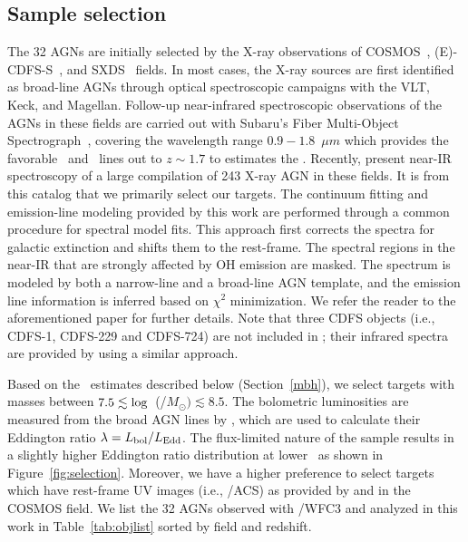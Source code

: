 \documentclass[apj]{emulateapj}
\begin{document}
\subsection{Sample selection}\label{sec:target_selection}

The 32 AGNs are initially selected by the X-ray observations of COSMOS~\citep{Civano2016}, (E)-CDFS-S~\citep{Lehmer2005, Xue2011}, and SXDS~\citep{Ueda2008} fields. In most cases, the X-ray sources are first identified as broad-line AGNs through optical spectroscopic campaigns with the VLT, Keck, and Magellan. Follow-up near-infrared spectroscopic observations of the AGNs in these fields are carried out with Subaru's Fiber Multi-Object Spectrograph~\citep[FMOS, ][]{Kimura2010, Nobuta2012,Matsuoka2013}, covering the wavelength range $0.9-1.8$~$\mu m$ which provides the favorable \halpha\ and \hbeta\ lines out to $z\sim1.7$ to estimates the \mbh. Recently, \citet{Schulze2018} present near-IR spectroscopy of a large compilation of 243 X-ray AGN in these fields. It is from this catalog that we primarily select our targets. 
The continuum fitting and emission-line modeling provided by this work are performed through a common procedure for spectral model fits. This approach first corrects the spectra for galactic extinction and shifts them to the rest-frame. The spectral regions in the near-IR that are strongly affected by OH emission are masked. The spectrum is modeled by both a narrow-line and a broad-line AGN template, and the emission line information is inferred based on $\chi^2$ minimization. We refer the reader to the aforementioned paper for further details.
Note that three CDFS objects (i.e., CDFS-1, CDFS-229 and CDFS-724) are not included in \citet{Schulze2018}; their infrared spectra are provided by \citet{Suh2015} using a similar approach.

Based on the \mbh\ estimates described below (Section~\ref{mbh}), we select targets with masses between $7.5 \lesssim {\rm log}$~(\mbh/$M_{\odot})\lesssim8.5$. The bolometric luminosities are measured from the broad AGN lines by \citet[][Section 3.3]{Schulze2018}, which are used to calculate their Eddington ratio $\lambda = L_{\rm bol}/L_{\rm Edd}$. The flux-limited nature of the sample results in a slightly higher Eddington ratio distribution at lower \mbh\, as shown in Figure~\ref{fig:selection}. Moreover, we have a higher preference to select targets which have rest-frame UV images (i.e., \hst/ACS) as provided by \citet{Scoville2007} and \citet{Koekemoer2007} in the COSMOS field. We list the 32 AGNs observed with \hst/WFC3 and analyzed in this work in Table~\ref{tab:objlist} sorted by field and redshift.
\end{document}
